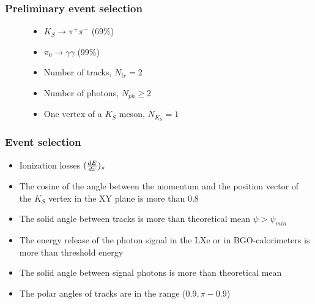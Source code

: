 \documentclass[14pt, hyperref = {colorlinks}]{beamer}
\begin{document}
\begin{frame}\label{r}
\frametitle{Preliminary event selection}
\begin{figure}[h]
\begin{minipage}[h]{0.59\linewidth}

\begin{itemize}
    \item $K_{S} \to \pi^{+} \pi^{-}$ (69\%)
    \item $\pi_{0} \to \gamma \gamma$ (99\%)
\end{itemize}
\begin{itemize}
  \item {Number of tracks, $N_{tr} = 2$} 
  \item {Number of photons, $N_{ph} \geq 2$}
  \item {One vertex of a $K_{S}$ meson, $N_{K_{S}} = 1$}
\end{itemize}
\end{minipage}
\begin{minipage}[h]{0.39\linewidth}
\end{minipage}
\end{figure}
\end{frame}

\begin{frame}\label{r}
\frametitle{Event selection}
\begin{itemize}
  \item {Ionization losses {$({dE\over{dx}})_{\pi}$}}
  \item {The cosine of the angle between the momentum and the position vector of the $K_{S}$ vertex in the XY plane is more than 0.8}
  \item {The solid angle between tracks is more than theoretical mean {$\psi > \psi_{min}$}}
  \item {The energy release of the photon signal in the LXe or in BGO-calorimeters is more than threshold energy}
  \item {The solid angle between signal photons is more than theoretical mean}
  \item {The polar angles of tracks are in the range ($0.9, \pi-0.9$)}
\end{itemize}
\end{frame}
\end{document}

